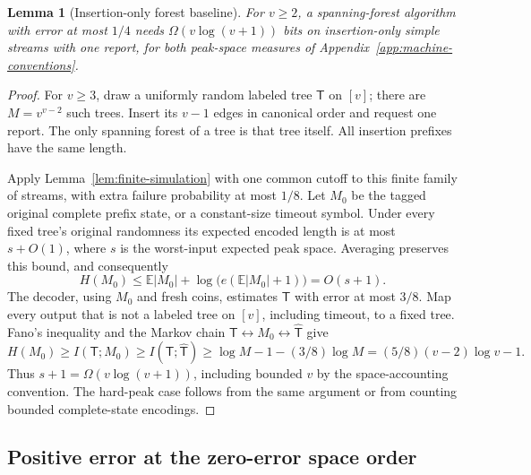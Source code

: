 \documentclass[11pt,letterpaper]{article}
\newtheorem{lemma}[theorem]{Lemma}
\numberwithin{equation}{section}
\newcommand{\E}{\mathbb E}
\begin{document}
\begin{lemma}[Insertion-only forest baseline]
\label{lem:randomized-forest-baseline}
For $v\ge2$, a spanning-forest algorithm with error at most $1/4$ needs $\Omega(v\log(v+1))$ bits on insertion-only simple streams with one report, for both peak-space measures of Appendix~\ref{app:machine-conventions}.
\end{lemma}
\begin{proof}
For $v\ge3$, draw a uniformly random labeled tree $\mathsf T$ on $[v]$; there are $M=v^{v-2}$ such trees.
Insert its $v-1$ edges in canonical order and request one report.
The only spanning forest of a tree is that tree itself.
All insertion prefixes have the same length.

Apply Lemma~\ref{lem:finite-simulation} with one common cutoff to this finite family of streams, with extra failure probability at most $1/8$.
Let $M_0$ be the tagged original complete prefix state, or a constant-size timeout symbol.
Under every fixed tree's original randomness its expected encoded length is at most $s+O(1)$, where $s$ is the worst-input expected peak space.
Averaging preserves this bound, and consequently
\[
 H(M_0)\le\E|M_0|+
 \log\bigl(e(\E|M_0|+1)\bigr)=O(s+1).
\]
The decoder, using $M_0$ and fresh coins, estimates $\mathsf T$ with error at most $3/8$.
Map every output that is not a labeled tree on $[v]$, including timeout, to a fixed tree.
Fano's inequality and the Markov chain $\mathsf T\leftrightarrow M_0\leftrightarrow\widehat{\mathsf T}$ give
\[
 H(M_0)\ge I(\mathsf T;M_0)\ge I(\mathsf T;\widehat{\mathsf T})
 \ge \log M-1-(3/8)\log M
 = (5/8)(v-2)\log v-1.
\]
Thus $s+1=\Omega(v\log(v+1))$, including bounded $v$ by the space-accounting convention.
The hard-peak case follows from the same argument or from counting bounded complete-state encodings.
\end{proof}


\subsection{Positive error at the zero-error space order}
\label{app:positive-error-exact}
\end{document}
